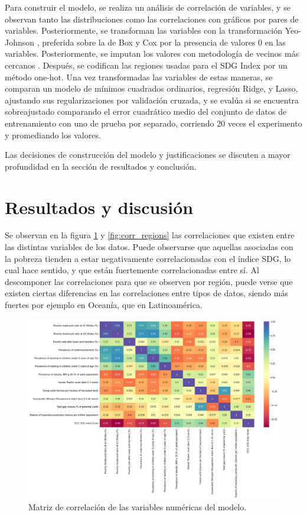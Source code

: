\documentclass[a4paper,12pt]{amsart}
\begin{document}
    Para construir el modelo, se realiza un análisis de correlación de variables, 
    y se observan tanto las distribuciones como las correlaciones con gráficos 
    por pares de variables. Posteriormente, se transforman las variables con la 
    transformación Yeo-Johnson \cite{yeo_new_2000}, preferida sobre la de Box y Cox por la presencia 
    de valores 0 en las variables. Posteriormente, se imputan los valores con 
    metodología de vecinos más cercanos \cite{beretta_nearest_2016}. Después, 
    se codifican las regiones usadas para el SDG Index por un método one-hot. 
    Una vez transformadas las variables de estas maneras, se comparan un modelo 
    de mínimos cuadrados ordinarios, regresión Ridge, y Lasso, ajustando sus 
    regularizaciones por validación cruzada, y se evalúa si se encuentra 
    sobreajustado comparando el error cuadrático medio del conjunto de datos 
    de entrenamiento con uno de prueba por separado, corriendo 20 veces el 
    experimento y promediando los valores.

    Las decisiones de construcción del modelo y justificaciones se discuten a
    mayor profundidad en la sección de resultados y conclusión.

    \section{Resultados y discusión}
    Se observan en la figura \ref{fig:correlations} y \ref{fig:corr_regions} las 
    correlaciones que existen entre las distintas variables de los datos. Puede observarse 
    que aquellas asociadas con la pobreza tienden a estar negativamente correlacionadas 
    con el índice SDG, lo cual hace sentido, y que están fuertemente correlacionadas entre 
    sí. Al descomponer las correlaciones para que se observen por región, puede 
    verse que existen ciertas diferencias en las correlaciones entre tipos de datos, siendo 
    más fuertes por ejemplo en Oceanía, que en Latinoamérica. 
    \begin{figure}[!ht]
        \includegraphics[width=\linewidth]{Images/Corr_todos.png}
        \caption{Matriz de correlación de las variables numéricas del modelo.}\label{fig:correlations}
    \end{figure}
\end{document}
